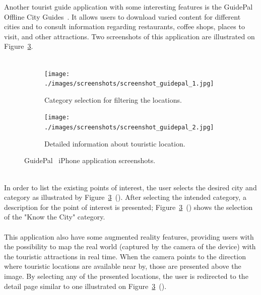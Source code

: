 \iffalse
Another tourist guide application with some interesting features is the GuidePal Offline City Guides~\cite{GuidePalWeb}\cite{GuidePaliPhone}. It allows users to download varied content for different cities and to consult information regarding restaurants, coffee shops, places to visit, and other attractions. Two screenshots of this application are illustrated on Figure~\ref{fig:guidePalIphoneScreenshots}.\\
\\
\begin{figure}
        \centering
        \begin{subfigure}[b]{0.25\textwidth}
                \centering
                \texttt{[image: ./images/screenshots/screenshot\_guidepal\_1.jpg]}
                \caption{Category selection for filtering the locations.}
                \label{fig:guidePalCategorySelection}
        \end{subfigure}%
        \quad\quad\quad\quad\quad
        \begin{subfigure}[b]{0.25\textwidth}
                \centering
                \texttt{[image: ./images/screenshots/screenshot\_guidepal\_2.jpg]}
                \caption{Detailed information about touristic location.}
                \label{fig:guidePalDetailedInformation}
        \end{subfigure}
        \caption{GuidePal~\cite{GuidePalWeb}\cite{GuidePaliPhone} iPhone application screenshots.}
        \label{fig:guidePalIphoneScreenshots}
\end{figure}
\\
In order to list the existing points of interest, the user selects the desired city and category as illustrated by  Figure~\ref{fig:guidePalIphoneScreenshots}~(). After selecting the intended category, a description for the point of interest is presented; Figure~\ref{fig:guidePalIphoneScreenshots}~() shows the selection of the "Know the City" category.\\
\\
This application also have some augmented reality features, providing users with the possibility to map the real world (captured by the camera of the device) with the touristic attractions in real time. When the camera points to the direction where touristic locations are available near by, those are presented above the image. By selecting any of the presented locations, the user is redirected to the detail page similar to one illustrated on Figure~\ref{fig:guidePalIphoneScreenshots}~().
